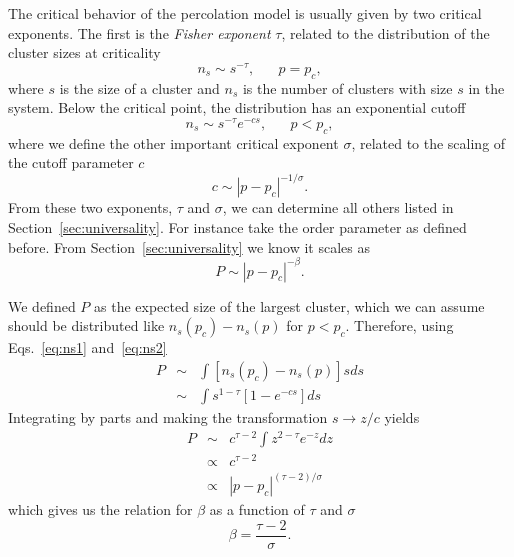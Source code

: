 The critical behavior of the percolation model is usually given by two critical
exponents. The first is the \textit{Fisher exponent} $\tau$, related to
the distribution of the cluster sizes at criticality
\begin{equation}
    \label{eq:ns1}
    n_s\sim s^{-\tau},\;\;\;\;\;\;p=p_c,
\end{equation}
where $s$ is the size of a cluster and $n_s$ is the number of clusters with
size $s$ in the system. Below the critical point, the distribution has an
exponential cutoff
\begin{equation}
    \label{eq:ns2}
    n_s\sim s^{-\tau}e^{-cs},\;\;\;\;\;\;p<p_c,
\end{equation}
where we define the other important critical exponent $\sigma$, related
to the scaling of the cutoff parameter $c$
\begin{equation}
    \label{eq:sig}
    c\sim \left|p-p_c\right|^{-1/\sigma}.
\end{equation}
From these two exponents, $\tau$ and $\sigma$, we can determine all others
listed in Section~\ref{sec:universality}. For instance take the order parameter
as defined before. From Section~\ref{sec:universality} we know it scales as
\begin{equation}
    P\sim\left|p-p_c\right|^{-\beta}.
\end{equation}

We defined $P$ as the expected size of the largest cluster, which
we can assume should be distributed like $n_s(p_c)-n_s(p)$ for
$p < p_c$. Therefore, using Eqs.~\ref{eq:ns1} and~\ref{eq:ns2}
\begin{eqnarray}
    P & \sim & \int\left[n_{s}\left(p_{c}\right)-n_{s}\left(p\right)\right]sds\\
      & \sim & \int s^{1-\tau}\left[1-e^{-cs}\right]ds
\end{eqnarray}
Integrating by parts and making the transformation $s\rightarrow z/c$ yields
\begin{eqnarray}
P & \sim & c^{\tau-2}\int z^{2-\tau}e^{-z}dz\\
 & \propto & c^{\tau-2}\\
 & \propto & \left|p-p_{c}\right|^{\left(\tau-2\right)/\sigma}
\end{eqnarray}
which gives us the relation for $\beta$ as a function of $\tau$ and $\sigma$
\begin{equation}
    \beta=\frac{\tau-2}{\sigma}.
\end{equation}
    
